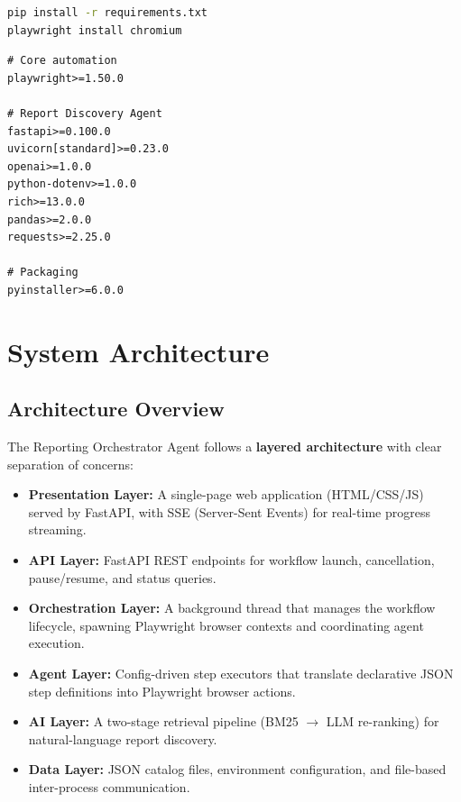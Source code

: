 \documentclass[12pt,a4paper]{article}
\begin{document}
\begin{lstlisting}[language=bash, caption={Install all dependencies}, label={lst:install-deps}]
pip install -r requirements.txt
playwright install chromium
\end{lstlisting}

\begin{lstlisting}[caption={requirements.txt}, label={lst:requirements-txt}]
# Core automation
playwright>=1.50.0

# Report Discovery Agent
fastapi>=0.100.0
uvicorn[standard]>=0.23.0
openai>=1.0.0
python-dotenv>=1.0.0
rich>=13.0.0
pandas>=2.0.0
requests>=2.25.0

# Packaging
pyinstaller>=6.0.0
\end{lstlisting}

\section{System Architecture}
\label{sec:architecture}

\subsection{Architecture Overview}
\label{subsec:arch-overview}

The Reporting Orchestrator Agent follows a \textbf{layered architecture} with clear separation of concerns:

\begin{itemize}[leftmargin=2em]
  \item \textbf{Presentation Layer:} A single-page web application (HTML/CSS/JS) served by FastAPI, with SSE (Server-Sent Events) for real-time progress streaming.
  \item \textbf{API Layer:} FastAPI REST endpoints for workflow launch, cancellation, pause/resume, and status queries.
  \item \textbf{Orchestration Layer:} A background thread that manages the workflow lifecycle, spawning Playwright browser contexts and coordinating agent execution.
  \item \textbf{Agent Layer:} Config-driven step executors that translate declarative JSON step definitions into Playwright browser actions.
  \item \textbf{AI Layer:} A two-stage retrieval pipeline (BM25 $\rightarrow$ LLM re-ranking) for natural-language report discovery.
  \item \textbf{Data Layer:} JSON catalog files, environment configuration, and file-based inter-process communication.
\end{itemize}
\end{document}

